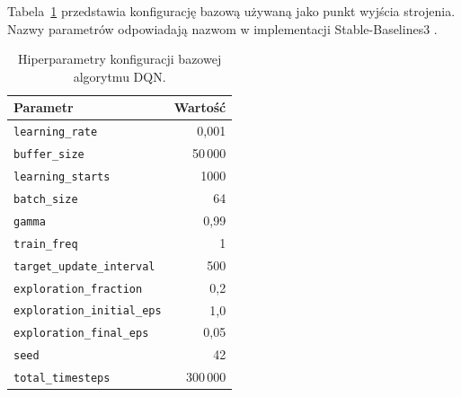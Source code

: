 Tabela~\ref{tab:konfiguracja-bazowa} przedstawia konfigurację bazową używaną jako punkt wyjścia strojenia. Nazwy parametrów odpowiadają nazwom w implementacji Stable-Baselines3 \cite{sb3_dqn_docs}.

\begin{table}[!htbp] \centering
    \caption{Hiperparametry konfiguracji bazowej algorytmu DQN.}
    \label{tab:konfiguracja-bazowa}
    \small
    \begin{tabular}{| l | r |} \hline
        Parametr & Wartość \\ \hline\hline
        \texttt{learning\_rate}            & 0,001 \\ \hline
        \texttt{buffer\_size}              & 50\,000 \\ \hline
        \texttt{learning\_starts}          & 1000 \\ \hline
        \texttt{batch\_size}               & 64 \\ \hline
        \texttt{gamma}                     & 0,99 \\ \hline
        \texttt{train\_freq}               & 1 \\ \hline
        \texttt{target\_update\_interval}  & 500 \\ \hline
        \texttt{exploration\_fraction}     & 0,2 \\ \hline
        \texttt{exploration\_initial\_eps} & 1,0 \\ \hline
        \texttt{exploration\_final\_eps}   & 0,05 \\ \hline
        \texttt{seed}                      & 42 \\ \hline
        \texttt{total\_timesteps}          & 300\,000 \\ \hline
    \end{tabular}
\end{table}

